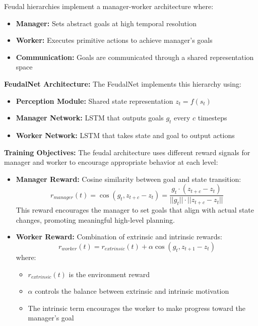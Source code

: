 \documentclass[12pt]{article}
\begin{document}
{{Feudal hierarchies implement a manager-worker architecture where:
\begin{itemize}
    \item \textbf{Manager:} Sets abstract goals at high temporal resolution
    \item \textbf{Worker:} Executes primitive actions to achieve manager's goals
    \item \textbf{Communication:} Goals are communicated through a shared representation space
\end{itemize}

\textbf{FeudalNet Architecture:}
The FeudalNet implements this hierarchy using:
\begin{itemize}
    \item \textbf{Perception Module:} Shared state representation $z_t = f(s_t)$
    \item \textbf{Manager Network:} LSTM that outputs goals $g_t$ every $c$ timesteps
    \item \textbf{Worker Network:} LSTM that takes state and goal to output actions
\end{itemize}

\textbf{Training Objectives:}
The feudal architecture uses different reward signals for manager and worker to encourage appropriate behavior at each level:

\begin{itemize}
    \item \textbf{Manager Reward:} Cosine similarity between goal and state transition:
    \[
    r_{manager}(t) = \cos(g_t, z_{t+c} - z_t) = \frac{g_t \cdot (z_{t+c} - z_t)}{||g_t|| \cdot ||z_{t+c} - z_t||}
    \]
    This reward encourages the manager to set goals that align with actual state changes, promoting meaningful high-level planning.
    
    \item \textbf{Worker Reward:} Combination of extrinsic and intrinsic rewards:
    \[
    r_{worker}(t) = r_{extrinsic}(t) + \alpha \cos(g_t, z_{t+1} - z_t)
    \]
    where:
    \begin{itemize}
        \item $r_{extrinsic}(t)$ is the environment reward
        \item $\alpha$ controls the balance between extrinsic and intrinsic motivation
        \item The intrinsic term encourages the worker to make progress toward the manager's goal
    \end{itemize}
\end{itemize}

}}
\end{document}
